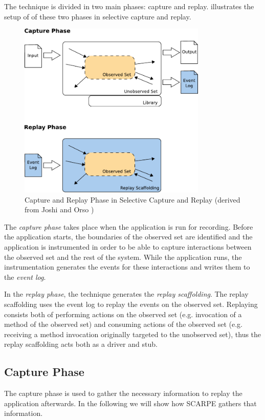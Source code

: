 The technique is divided in two main phases: capture and replay.  illustrates the setup of of these two phases in selective capture and replay.
\begin{figure}[ht]
  \centering
  \includegraphics[width=0.8\textwidth]{illustrations/scr_capture_replay_phase}
  \caption{Capture and Replay Phase in Selective Capture and Replay (derived from Joshi and Orso \cite{orso05may})}
  \label{fig:scr_capture_replay_phase}
\end{figure}
The \emph {capture phase} takes place when the application is run for recording. Before the application starts, the boundaries of the observed set are identified and the application is instrumented in order to be able to capture interactions between the observed set and the rest of the system. While the application runs, the instrumentation generates the events for these interactions and writes them to the \emph{event log}.

In the \emph{replay phase}, the technique generates the \emph{replay scaffolding}. The replay scaffolding uses the event log to replay the events on the observed set. Replaying consists both of performing actions on the observed set (e.g. invocation of a method of the observed set) and consuming actions of the observed set (e.g. receiving a method invocation originally targeted to the unobserved set), thus the replay scaffolding acts both as a driver and stub.

\subsection{Capture Phase}
The capture phase is used to gather the necessary information to replay the application afterwards. In the following we will show how SCARPE \cite{orso05may} gathers that information.

